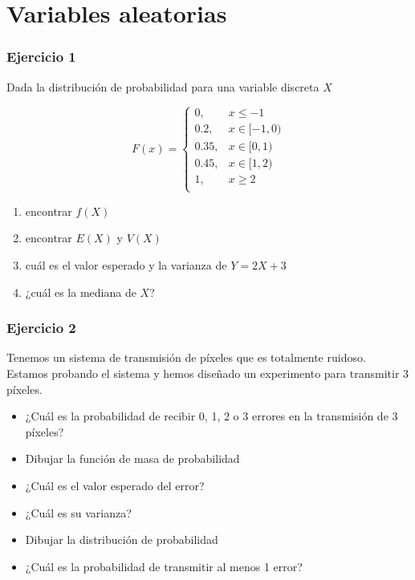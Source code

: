 \documentclass[
]{book}
\providecommand{\tightlist}{%
  \setlength{\itemsep}{0pt}\setlength{\parskip}{0pt}}
\begin{document}
\hypertarget{variables-aleatorias}{%
\section{Variables aleatorias}\label{variables-aleatorias}}

\hypertarget{ejercicio-1-3}{%
\subsubsection{Ejercicio 1}\label{ejercicio-1-3}}

Dada la distribución de probabilidad para una variable discreta \(X\)

\[
    F(x)= 
\begin{cases}
0, & x \leq -1 \\
0.2,& x \in [-1,0)\\
0.35,& x \in [0,1)\\
0.45,& x \in [1,2)\\
1,& x \geq 2\\
\end{cases}
\]

\begin{enumerate}
\def\labelenumi{\alph{enumi})}
\tightlist
\item
  encontrar \(f(X)\)
\item
  encontrar \(E(X)\) y \(V(X)\)
\item
  cuál es el valor esperado y la varianza de \(Y=2X+3\)
\item
  ¿cuál es la mediana de \(X\)?
\end{enumerate}

\hypertarget{ejercicio-2-3}{%
\subsubsection{Ejercicio 2}\label{ejercicio-2-3}}

Tenemos un sistema de transmisión de píxeles que es totalmente ruidoso. Estamos probando el sistema y hemos diseñado un experimento para transmitir 3 píxeles.

\begin{itemize}
\item
  ¿Cuál es la probabilidad de recibir 0, 1, 2 o 3 errores en la transmisión de 3 píxeles?
\item
  Dibujar la función de masa de probabilidad
\item
  ¿Cuál es el valor esperado del error?
\item
  ¿Cuál es su varianza?
\item
  Dibujar la distribución de probabilidad
\item
  ¿Cuál es la probabilidad de transmitir al menos 1 error?
\end{itemize}
\end{document}
